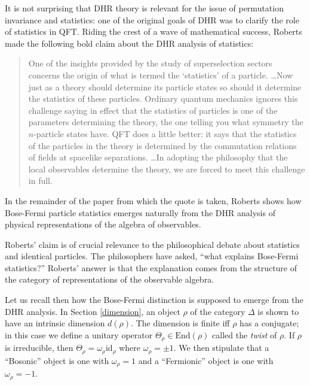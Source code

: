 \documentclass[12pt]{article}
\theoremstyle{definition}
\theoremstyle{definition}
\theoremstyle{remark}
\def\om{\omega} \def\Om{\Omega} \def\dd{\partial} \def\D{\Delta}
\newcommand{\End}{\mathrm{End}}
\def\id{\mathrm{id}}
\begin{document}
It is not surprising that DHR theory is relevant for the issue of
permutation invariance and statistics: one of the original goals of
DHR was to clarify the role of statistics in QFT.  Riding the crest of
a wave of mathematical success, Roberts made the following bold claim
about the DHR analysis of statistics:
\begin{quote}
  One of the insights provided by the study of
  superselection sectors concerns the origin of what is
  termed the `statistics' of a particle. \dots Now just
  as a theory should determine its particle states so
  should it determine the statistics of these
  particles.  Ordinary quantum mechanics ignores this
  challenge saying in effect that the statistics of
  particles is one of the parameters determining the
  theory, the one telling you what symmetry the
  $n$-particle states have.  QFT does a little better:
  it says that the statistics of the particles in the
  theory is determined by the commutation relations of
  fields at spacelike separations.  \ldots In adopting
  the philosophy that the local observables determine
  the theory, we are forced to meet this challenge in
  full.  \cite[p.\ 203]{rob-stat}
\end{quote} In the remainder of the paper from which the quote is
taken, Roberts shows how Bose-Fermi particle statistics emerges
naturally from the DHR analysis of physical representations of the
algebra of observables.

Roberts' claim is of crucial relevance to the philosophical debate
about statistics and identical particles.  The philosophers have
asked, ``what explains Bose-Fermi statistics?''  Roberts' answer is
that the explanation comes from the structure of the category of
representations of the observable algebra.

Let us recall then how the Bose-Fermi distinction is supposed to
emerge from the DHR analysis.  In Section \ref{dimension}, an object
$\rho$ of the category $\D$ is shown to have an intrinsic dimension
$d(\rho )$.  The dimension is finite iff $\rho$ has a conjugate; in
this case we define a unitary operator $\Theta _\rho \in
\End (\rho )$ called the \emph{twist} of $\rho$.  If $\rho$ is
irreducible, then $\Theta _{\rho}=\om _\rho \id _{\rho}$ where $\om
_\rho =\pm 1$.  We then stipulate that a ``Bosonic'' object is one
with $\om _\rho =1$ and a ``Fermionic'' object is one with $\om _\rho
=-1$.  
\end{document}
